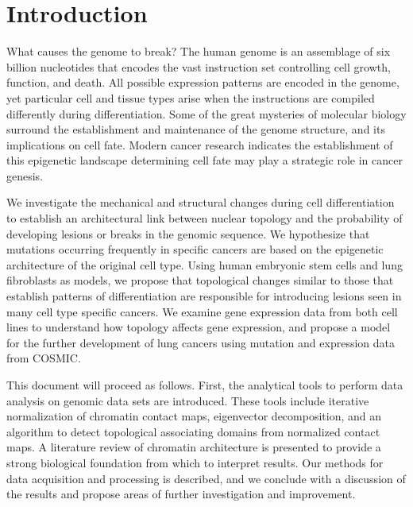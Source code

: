 
\chapter{Introduction}

What causes the genome to break?  The human genome is an assemblage of six billion nucleotides that encodes the vast instruction set
controlling cell growth, function, and death.  All possible expression patterns are encoded in the genome, yet particular
cell and tissue types arise when the instructions are compiled differently during differentiation.  Some of the great mysteries
of molecular biology surround the establishment and maintenance of the genome structure, and its implications on cell fate.  
Modern cancer research indicates the establishment of this \gls{epigenetic} landscape determining cell fate may play a
strategic role in cancer genesis.

We investigate the mechanical and structural changes during cell differentiation to establish an architectural link between
nuclear topology and the probability of developing lesions or breaks in the genomic sequence.  We hypothesize that mutations
occurring frequently in specific cancers are based on the epigenetic architecture of the original cell type.  Using human
embryonic stem cells and lung fibroblasts as models, we propose that topological changes similar to those that establish
patterns of differentiation are responsible for introducing lesions seen in many cell type specific cancers.  We examine
gene expression data from both cell lines to understand how topology affects gene expression, and propose a model
for the further development of lung cancers using mutation and expression data from \gls{COSMIC}.

This document will proceed as follows.  First, the analytical tools to perform data analysis on genomic data sets are introduced.
These tools include iterative normalization of chromatin contact maps, eigenvector decomposition, and an algorithm to detect
topological associating domains from normalized contact maps.  A literature review of chromatin architecture is presented to
provide a strong biological foundation from which to interpret results.  Our methods for data acquisition and processing is
described, and we conclude with a discussion of the results and propose areas of further investigation and improvement.

